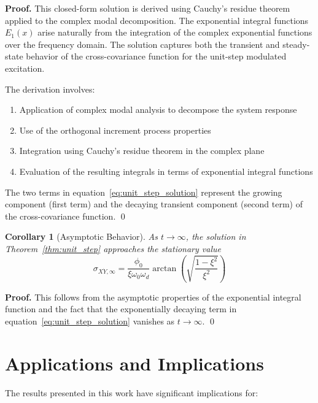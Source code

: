 \documentclass[12pt,a4paper]{article}
\newtheorem{corollary}[theorem]{Corollary}
\renewenvironment{proof}{\noindent\textbf{Proof.}}{\qed}
\begin{document}
\begin{proof}
This closed-form solution is derived using Cauchy's residue theorem applied to the complex modal decomposition. The exponential integral functions $E_1(x)$ arise naturally from the integration of the complex exponential functions over the frequency domain. The solution captures both the transient and steady-state behavior of the cross-covariance function for the unit-step modulated excitation.

The derivation involves:
\begin{enumerate}[label=(\arabic*)]
\item Application of complex modal analysis to decompose the system response
\item Use of the orthogonal increment process properties
\item Integration using Cauchy's residue theorem in the complex plane
\item Evaluation of the resulting integrals in terms of exponential integral functions
\end{enumerate}

The two terms in equation~\eqref{eq:unit_step_solution} represent the growing component (first term) and the decaying transient component (second term) of the cross-covariance function.
\end{proof}

\begin{corollary}[Asymptotic Behavior]\label{cor:asymptotic}
As $t \to \infty$, the solution in Theorem~\ref{thm:unit_step} approaches the stationary value
\begin{equation}\label{eq:stationary_value}
\sigma_{X\dot{Y},\infty} = \frac{\phi_0}{\xi\omega_0\omega_d} \arctan\left(\sqrt{\frac{1-\xi^2}{\xi^2}}\right)
\end{equation}
\end{corollary}

\begin{proof}
This follows from the asymptotic properties of the exponential integral function and the fact that the exponentially decaying term in equation~\eqref{eq:unit_step_solution} vanishes as $t \to \infty$.
\end{proof}

\section{Applications and Implications}

The results presented in this work have significant implications for:
\end{document}
